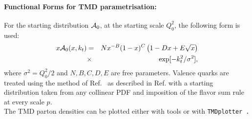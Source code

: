 \paragraph{Functional Forms for TMD parametrisation:} \rm

For the starting distribution ${\cal A}_0$, at the starting scale $Q_0^2$, 
the following form is used:
\begin{eqnarray}
x{\cal A}_0(x,\kt) &=& N x^{-B}(1 -x)^{C}\left(1 -D x 
+ E \sqrt{x}   \right) \nonumber\\
   &\times &\exp[ - k_t^2 / \sigma^2 ], 
\label{a0-5par}
\end{eqnarray}
where $ \sigma^2  =  Q_0^2 / 2 $ and $N, B, C, D, E$ are free parameters.
Valence quarks are treated using the method of Ref.~\cite{Deak:2010gk} as described 
in Ref. \cite{Hautmann:2013tba} with a starting distribution taken from any collinear PDF
and imposition of the flavor sum rule at every scale $p$.
\\
The TMD parton densities can be plotted either with \fitter tools 
or with \tt TMDplotter\rm~\cite{tmdlref}.


